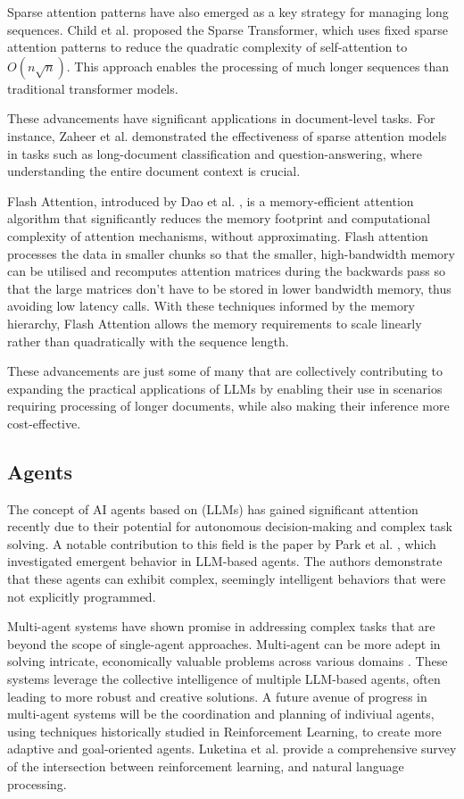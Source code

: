 \documentclass[a4paper, oneside]{discothesis}
\begin{document}
Sparse attention patterns have also emerged as a key strategy for managing long sequences. Child et al. \cite{child2019generating} proposed the Sparse Transformer, which uses fixed sparse attention patterns to reduce the quadratic complexity of self-attention to $O(n\sqrt{n})$. This approach enables the processing of much longer sequences than traditional transformer models.

These advancements have significant applications in document-level tasks. For instance, Zaheer et al. \cite{zaheer2021big} demonstrated the effectiveness of sparse attention models in tasks such as long-document classification and question-answering, where understanding the entire document context is crucial.

Flash Attention, introduced by Dao et al. \cite{dao2023flashattention2fasterattentionbetter}, is a memory-efficient attention algorithm that significantly reduces the memory footprint and computational complexity of attention mechanisms, without approximating. Flash attention processes the data in smaller chunks so that the smaller, high-bandwidth memory can be utilised and recomputes attention matrices during the backwards pass so that the large matrices don't have to be stored in lower bandwidth memory, thus avoiding low latency calls. With these techniques informed by the memory hierarchy, Flash Attention allows the memory requirements to scale linearly rather than quadratically with the sequence length. 

These advancements are just some of many that are collectively contributing to expanding the practical applications of LLMs by enabling their use in scenarios requiring processing of longer documents, while also making their inference more cost-effective. 

\subsection{Agents}
The concept of AI agents based on (LLMs) has gained significant attention recently due to their potential for autonomous decision-making and complex task solving. A notable contribution to this field is the paper by Park et al. \cite{park2023generativeagentsinteractivesimulacra}, which investigated emergent behavior in LLM-based agents. The authors demonstrate that these agents can exhibit complex, seemingly intelligent behaviors that were not explicitly programmed.

Multi-agent systems have shown promise in addressing complex tasks that are beyond the scope of single-agent approaches. Multi-agent can be more adept in solving intricate, economically valuable problems across various domains \cite{chen2024autoagentsframeworkautomaticagent}. 
These systems leverage the collective intelligence of multiple LLM-based agents, often leading to more robust and creative solutions. A future avenue of progress in multi-agent systems will be the coordination and planning of indiviual agents, using techniques historically studied in Reinforcement Learning, to create more adaptive and goal-oriented agents. Luketina et al. \cite{luketina2019survey} provide a comprehensive survey of the intersection between reinforcement learning, and natural language processing.
\end{document}
